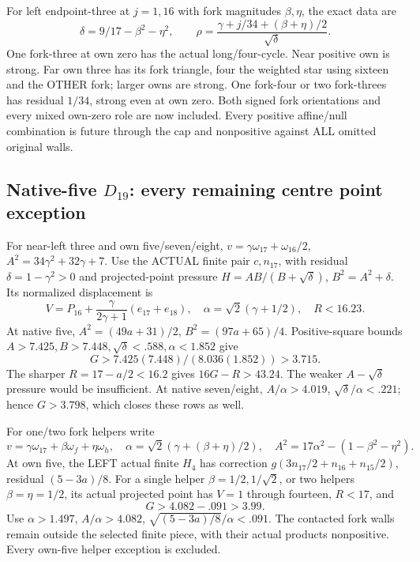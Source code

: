 \documentclass[11pt]{article}
\theoremstyle{definition}
\theoremstyle{remark}
\begin{document}
For left endpoint-three at
\(j=1,16\) with fork magnitudes
\(\beta,\eta\), the exact data
are
\[
 \delta=9/17-\beta^2-\eta^2,\qquad
               \rho=\frac{\gamma+j/34+(\beta+\eta)/2}{\sqrt\delta}.
\]
One fork-three at own zero
has the actual long/four-cycle.
Near positive own is strong.
Far own three has its fork
triangle, four the weighted
star using sixteen and the
OTHER fork; larger owns are
strong.
One fork-four or two fork-threes
has residual \(1/34\), strong
even at own zero.
Both signed fork orientations
and every mixed own-zero role
are now included.
Every positive affine/null
combination is future through
the cap and nonpositive against
ALL omitted original walls.


\subsection{Native-five \(D_{19}\): every remaining centre point exception}
\label{app:exact19:Dfivecentrepoints}

For near-left three and own
five/seven/eight,
\(v=\gamma\omega_{17}+\omega_{16}/2\),
\(A^2=34\gamma^2+32\gamma+7\).
Use the ACTUAL finite pair
\(c,n_{17}\), with residual
\(\delta=1-\gamma^2>0\) and
projected-point pressure
\(H=AB/(B+\sqrt\delta)\),
\(B^2=A^2+\delta\).
Its normalized displacement is
\[
 V=P_{16}+\frac{\gamma}{2\gamma+1}(e_{17}+e_{18}),
              \quad\alpha=\sqrt2(\gamma+1/2),\quad R<16.23 .
\]
At native five,
\(A^2=(49a+31)/2\),
\(B^2=(97a+65)/4\).
Positive-square bounds
\(A>7.425,B>7.448,\sqrt\delta<.588,\alpha<1.852\)
give
\[
                      G>7.425(7.448)/(8.036(1.852))>3.715 .
\]
The sharper \(R=17-a/2<16.2\)
gives \(16G-R>43.24\).
The weaker \(A-\sqrt\delta\)
pressure would be insufficient.
At native seven/eight,
\(A/\alpha>4.019\),
\(\sqrt\delta/\alpha<.221\);
hence \(G>3.798\), which closes
these rows as well.

For one/two fork helpers write
\[
 v=\gamma\omega_{17}+\beta\omega_f+\eta\omega_h,\quad
 \alpha=\sqrt2(\gamma+(\beta+\eta)/2),\quad
                    A^2=17\alpha^2-(1-\beta^2-\eta^2).
\]
At own five, the LEFT actual
finite \(H_4\) has correction
\(g(3n_{17}/2+n_{16}+n_{15}/2)\),
residual \((5-3a)/8\).
For a single helper
\(\beta=1/2,1/\sqrt2\), or
two helpers \(\beta=\eta=1/2\),
its actual projected point has
\(V=1\) through fourteen,
\(R<17\), and
\[
                         G>4.082-.091>3.99 .
\]
Use \(\alpha>1.497\),
\(A/\alpha>4.082\),
\(\sqrt{(5-3a)/8}/\alpha<.091\).
The contacted fork walls remain
outside the selected finite
piece, with their actual
products nonpositive.
Every own-five helper exception
is excluded.
\end{document}
